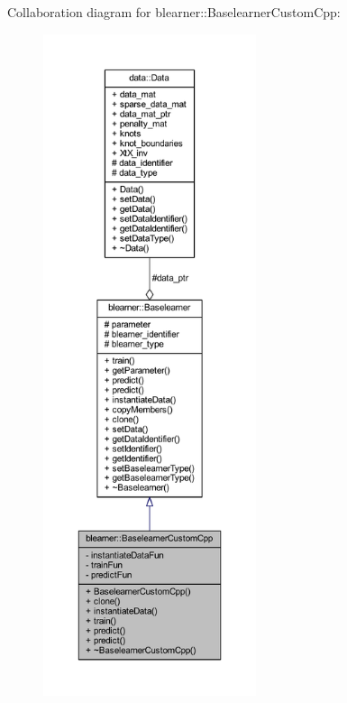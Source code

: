 Collaboration diagram for blearner\+:\+:Baselearner\+Custom\+Cpp\+:
\nopagebreak
\begin{figure}[H]
\begin{center}
\leavevmode
\includegraphics[height=550pt]{classblearner_1_1_baselearner_custom_cpp__coll__graph}
\end{center}
\end{figure}
